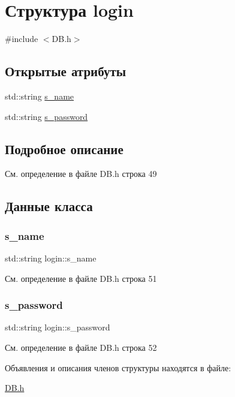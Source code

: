 \hypertarget{structlogin}{}\section{Структура login}
\label{structlogin}


{\ttfamily \#include $<$D\+B.\+h$>$}

\subsection*{Открытые атрибуты}
\begin{DoxyCompactItemize}
\item 
std\+::string \mbox{\hyperlink{structlogin_acf93d411362f367b1fb7c35337d0606d}{s\+\_\+name}}
\item 
std\+::string \mbox{\hyperlink{structlogin_a9c4b7efff9382117bd288f9cc42a4e28}{s\+\_\+password}}
\end{DoxyCompactItemize}


\subsection{Подробное описание}


См. определение в файле D\+B.\+h строка 49



\subsection{Данные класса}
\mbox{\label{structlogin_acf93d411362f367b1fb7c35337d0606d}} 
\subsubsection{\texorpdfstring{s\_name}{s\_name}}
{\footnotesize\ttfamily std\+::string login\+::s\+\_\+name}



См. определение в файле D\+B.\+h строка 51

\mbox{\label{structlogin_a9c4b7efff9382117bd288f9cc42a4e28}} 
\subsubsection{\texorpdfstring{s\_password}{s\_password}}
{\footnotesize\ttfamily std\+::string login\+::s\+\_\+password}



См. определение в файле D\+B.\+h строка 52



Объявления и описания членов структуры находятся в файле\+:\begin{DoxyCompactItemize}
\item 
\mbox{\hyperlink{_d_b_8h}{D\+B.\+h}}\end{DoxyCompactItemize}
